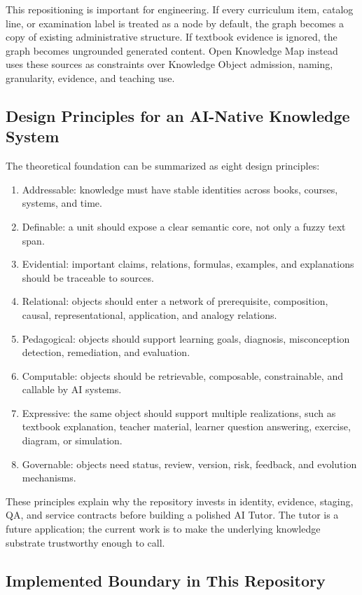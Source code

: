 \documentclass[11pt,letterpaper]{article}
\newcommand{\OKM}{Open Knowledge Map}
\begin{document}
This repositioning is important for engineering. If every curriculum item, catalog line, or examination label is treated as a node by default, the graph becomes a copy of existing administrative structure. If textbook evidence is ignored, the graph becomes ungrounded generated content. \OKM{} instead uses these sources as constraints over Knowledge Object admission, naming, granularity, evidence, and teaching use.

\subsection{Design Principles for an AI-Native Knowledge System}

The theoretical foundation can be summarized as eight design principles:

\begin{enumerate}
  \item Addressable: knowledge must have stable identities across books, courses, systems, and time.
  \item Definable: a unit should expose a clear semantic core, not only a fuzzy text span.
  \item Evidential: important claims, relations, formulas, examples, and explanations should be traceable to sources.
  \item Relational: objects should enter a network of prerequisite, composition, causal, representational, application, and analogy relations.
  \item Pedagogical: objects should support learning goals, diagnosis, misconception detection, remediation, and evaluation.
  \item Computable: objects should be retrievable, composable, constrainable, and callable by AI systems.
  \item Expressive: the same object should support multiple realizations, such as textbook explanation, teacher material, learner question answering, exercise, diagram, or simulation.
  \item Governable: objects need status, review, version, risk, feedback, and evolution mechanisms.
\end{enumerate}

These principles explain why the repository invests in identity, evidence, staging, QA, and service contracts before building a polished AI Tutor. The tutor is a future application; the current work is to make the underlying knowledge substrate trustworthy enough to call.

\subsection{Implemented Boundary in This Repository}
\end{document}
